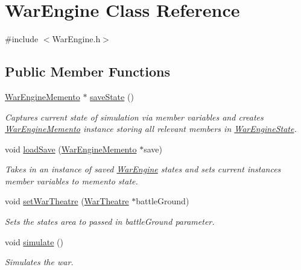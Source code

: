 \hypertarget{classWarEngine}{}\section{War\+Engine Class Reference}
\label{classWarEngine}


{\ttfamily \#include $<$War\+Engine.\+h$>$}

\subsection*{Public Member Functions}
\begin{DoxyCompactItemize}
\item 
\hyperlink{classWarEngineMemento}{War\+Engine\+Memento} $\ast$ \hyperlink{classWarEngine_afe7e71964cca280d52f4298e97e1a8d7}{save\+State} ()
\begin{DoxyCompactList}\small\item\em Captures current state of simulation via member variables and creates \hyperlink{classWarEngineMemento}{War\+Engine\+Memento} instance storing all relevant members in \hyperlink{classWarEngineState}{War\+Engine\+State}. \end{DoxyCompactList}\item 
void \hyperlink{classWarEngine_a715995a703811197d16102ca80bf6fca}{load\+Save} (\hyperlink{classWarEngineMemento}{War\+Engine\+Memento} $\ast$save)
\begin{DoxyCompactList}\small\item\em Takes in an instance of saved \hyperlink{classWarEngine}{War\+Engine} states and sets current instance\textquotesingle{}s member variables to memento state. \end{DoxyCompactList}\item 
void \hyperlink{classWarEngine_ad3204f345ee8d36a37e8d47700420825}{set\+War\+Theatre} (\hyperlink{classWarTheatre}{War\+Theatre} $\ast$battle\+Ground)
\begin{DoxyCompactList}\small\item\em Sets the state\textquotesingle{}s area to passed in battle\+Ground parameter. \end{DoxyCompactList}\item 
void \hyperlink{classWarEngine_a8990aec96d7e77f10b39f4ac05dca43b}{simulate} ()
\begin{DoxyCompactList}\small\item\em Simulates the war. \end{DoxyCompactList}\end{DoxyCompactItemize}
